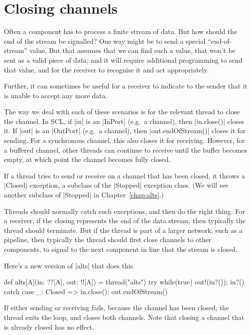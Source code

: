 \section{Closing channels}

Often a component has to process a finite stream of data.  But how should the
end of the stream be signalled?  One way might be to send a special
``end-of-stream'' value.  But that assumes that we can find such a value, that
won't be sent as a valid piece of data; and it will require additional
programming to send that value, and for the receiver to recognise it and act
appropriately. 

Further, it can sometimes be useful for a receiver to indicate to the sender
that it is unable to accept any more data.

The way we deal with each of these scenarios is for the relevant thread to
close the channel. 
%
In SCL, if |in| is an |InPort| (e.g.~a channel), then |in.close()| closes it.
%
If |out| is an |OutPort| (e.g.~a channel), then |out.endOfStream()| closes it
for sending.  For a synchronous channel, this also closes it for receiving.
However, for a buffered channel, other threads can continue to receive until
the buffer becomes empty, at which point the channel becomes fully closed.


If a thread tries to send or receive on a channel that has been closed, it
throws a |Closed| exception, a subclass of the |Stopped| exception class.
(We will see another subclass of |Stopped| in Chapter~\ref{chap:alts}.)

Threads should normally catch such exceptions, and then do the right thing.
For a receiver, if the closing represents the end of the data stream, then
typically the thread should terminate.  But if the thread is part of a larger
network, such as a pipeline, then typically the thread should first close
channels to other components, to signal to the next component in line that the
stream is closed.


Here's a new version of |alts| that does this.
%
\begin{scala}
  def alts[A](in: ??[A], out: !![A]) = thread("alts"){ 
    try{ while(true){ out!(in?()); in?() } } 
    catch{ case _: Closed => in.close(); out.endOfStream() }
  }
\end{scala}
% 
If either sending or receiving fails, because the channel has been closed, the
thread exits the loop, and closes both channels.  Note that closing a channel
that is already closed has no effect.


